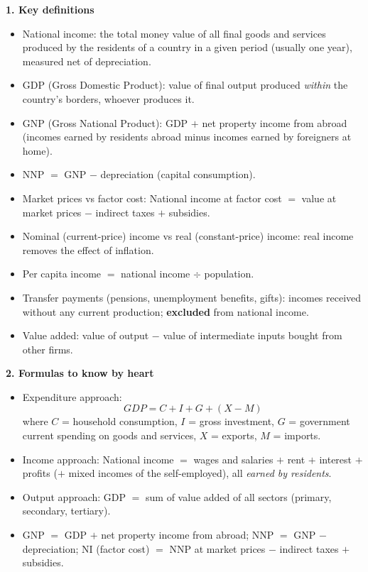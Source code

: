 \documentclass[11pt]{article}
\newcommand{\cle}[1]{{\popxbold\color{popdark}#1}}
\begin{document}
\begin{bilan}
\textbf{1. Key definitions}\par
\begin{itemize}
\item \cle{National income}: the total money value of all final goods and services produced by the residents of a country in a given period (usually one year), measured net of depreciation.
\item \cle{GDP} (Gross Domestic Product): value of final output produced \emph{within} the country's borders, whoever produces it.
\item \cle{GNP} (Gross National Product): GDP $+$ \cle{net property income from abroad} (incomes earned by residents abroad minus incomes earned by foreigners at home).
\item \cle{NNP} $=$ GNP $-$ \cle{depreciation} (capital consumption).
\item \cle{Market prices} vs \cle{factor cost}: National income at factor cost $=$ value at market prices $-$ indirect taxes $+$ subsidies.
\item \cle{Nominal} (current-price) income vs \cle{real} (constant-price) income: real income removes the effect of inflation.
\item \cle{Per capita income} $=$ national income $\div$ population.
\item \cle{Transfer payments} (pensions, unemployment benefits, gifts): incomes received without any current production; \textbf{excluded} from national income.
\item \cle{Value added}: value of output $-$ value of intermediate inputs bought from other firms.
\end{itemize}

\textbf{2. Formulas to know by heart}\par
\begin{itemize}
\item Expenditure approach: \[ GDP = C + I + G + (X - M) \] where $C$ = household consumption, $I$ = gross investment, $G$ = government current spending on goods and services, $X$ = exports, $M$ = imports.
\item Income approach: National income $=$ wages and salaries $+$ rent $+$ interest $+$ profits ($+$ mixed incomes of the self-employed), all \emph{earned by residents}.
\item Output approach: GDP $=$ sum of \cle{value added} of all sectors (primary, secondary, tertiary).
\item GNP $=$ GDP $+$ net property income from abroad; NNP $=$ GNP $-$ depreciation; NI (factor cost) $=$ NNP at market prices $-$ indirect taxes $+$ subsidies.
\end{itemize}


\end{bilan}
\end{document}

